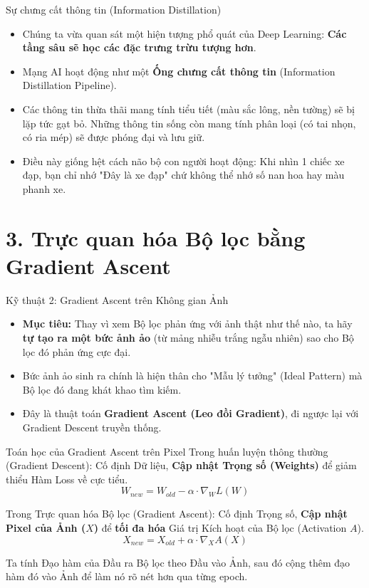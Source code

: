\documentclass[aspectratio=169]{beamer}
\begin{document}
\begin{frame}{Sự chưng cất thông tin (Information Distillation)}
    \begin{itemize}
        \item Chúng ta vừa quan sát một hiện tượng phổ quát của Deep Learning: \textbf{Các tầng sâu sẽ học các đặc trưng trừu tượng hơn}.
        \item Mạng AI hoạt động như một \textbf{Ống chưng cất thông tin} (Information Distillation Pipeline).
        \item Các thông tin thừa thãi mang tính tiểu tiết (màu sắc lông, nền tường) sẽ bị lặp tức gạt bỏ. Những thông tin sống còn mang tính phân loại (có tai nhọn, có ria mép) sẽ được phóng đại và lưu giữ.
        \item Điều này giống hệt cách não bộ con người hoạt động: Khi nhìn 1 chiếc xe đạp, bạn chỉ nhớ "Đây là xe đạp" chứ không thể nhớ số nan hoa hay màu phanh xe.
    \end{itemize}
\end{frame}

\section{3. Trực quan hóa Bộ lọc bằng Gradient Ascent}

\begin{frame}{Kỹ thuật 2: Gradient Ascent trên Không gian Ảnh}
    \begin{itemize}
        \item \textbf{Mục tiêu:} Thay vì xem Bộ lọc phản ứng với ảnh thật như thế nào, ta hãy \textbf{tự tạo ra một bức ảnh ảo} (từ mảng nhiễu trắng ngẫu nhiên) sao cho Bộ lọc đó phản ứng cực đại.
        \item Bức ảnh ảo sinh ra chính là hiện thân cho "Mẫu lý tưởng" (Ideal Pattern) mà Bộ lọc đó đang khát khao tìm kiếm.
        \item Đây là thuật toán \textbf{Gradient Ascent (Leo đồi Gradient)}, đi ngược lại với Gradient Descent truyền thống.
    \end{itemize}
\end{frame}

\begin{frame}{Toán học của Gradient Ascent trên Pixel}
    Trong huấn luyện thông thường (Gradient Descent): Cố định Dữ liệu, \textbf{Cập nhật Trọng số (Weights)} để giảm thiểu Hàm Loss về cực tiểu.
    \begin{equation}
        W_{new} = W_{old} - \alpha \cdot \nabla_W L(W)
    \end{equation}
    
    Trong Trực quan hóa Bộ lọc (Gradient Ascent): Cố định Trọng số, \textbf{Cập nhật Pixel của Ảnh ($X$)} để \textbf{tối đa hóa} Giá trị Kích hoạt của Bộ lọc (Activation $A$).
    \begin{equation}
        X_{new} = X_{old} + \alpha \cdot \nabla_X A(X)
    \end{equation}
    
    Ta tính Đạo hàm của Đầu ra Bộ lọc theo Đầu vào Ảnh, sau đó cộng thêm đạo hàm đó vào Ảnh để làm nó rõ nét hơn qua từng epoch.
\end{frame}
\end{document}

